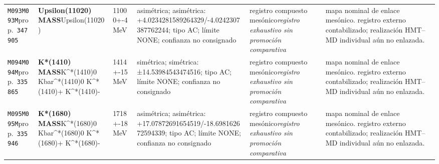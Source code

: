 \begin{landscape}
\begin{longtable}{L{1.85cm}L{4.45cm}L{2.35cm}L{4.05cm}L{3.35cm}L{7.15cm}}
\texttt{M093}\newline \texttt{M093M}\newline prop.\ \texttt{347905} & \textbf{Upsilon(11020) MASS}\newline Upsilon(11020) & 11000+-4\,MeV & asimétrica; asimétrica: +4.0234281589264329/-4.0242307387762244; tipo AC; límite NONE; confianza no consignado & registro compuesto mesónico\newline \emph{registro exhaustivo sin promoción comparativa} & mapa nominal de enlace mesónico. registro externo contabilizado; realización HMT--MD individual aún no enlazada. \\
\texttt{M094}\newline \texttt{M094M}\newline prop.\ \texttt{335865} & \textbf{K*(1410) MASS}\newline K\textasciicircum{}*(1410)0 \textbar{}\allowbreak{} Kbar\textasciicircum{}*(1410)0 \textbar{}\allowbreak{} K\textasciicircum{}*(1410)+ \textbar{}\allowbreak{} K\textasciicircum{}*(1410)- & 1414+-15\,MeV & simétrica; simétrica: ±14.53984543474516; tipo AC; límite NONE; confianza no consignado & registro compuesto mesónico\newline \emph{registro exhaustivo sin promoción comparativa} & mapa nominal de enlace mesónico. registro externo contabilizado; realización HMT--MD individual aún no enlazada. \\
\texttt{M095}\newline \texttt{M095M}\newline prop.\ \texttt{335946} & \textbf{K*(1680) MASS}\newline K\textasciicircum{}*(1680)0 \textbar{}\allowbreak{} Kbar\textasciicircum{}*(1680)0 \textbar{}\allowbreak{} K\textasciicircum{}*(1680)+ \textbar{}\allowbreak{} K\textasciicircum{}*(1680)- & 1718+-18\,MeV & asimétrica; asimétrica: +17.07872691654519/-18.698162672594339; tipo AC; límite NONE; confianza no consignado & registro compuesto mesónico\newline \emph{registro exhaustivo sin promoción comparativa} & mapa nominal de enlace mesónico. registro externo contabilizado; realización HMT--MD individual aún no enlazada. \\

\end{longtable}
\end{landscape}
